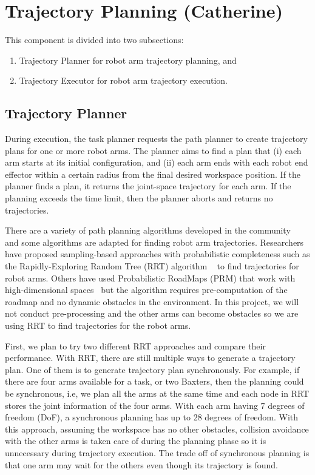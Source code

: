 \section{Trajectory Planning (Catherine)}

This component is divided into two subsections:
\begin{enumerate}%
\item Trajectory Planner for robot arm trajectory planning, and
\item Trajectory Executor for robot arm trajectory execution.
\end{enumerate}

\subsection{Trajectory Planner}

During execution, the task planner requests the path planner to create trajectory plans for one or more robot arms. The planner aims to find a plan that (i) each arm starts at its initial configuration, and (ii) each arm ends with each robot end effector within a certain radius from the final desired workspace position. If the planner finds a plan, it returns the joint-space trajectory for each arm. If the planning exceeds the time limit, then the planner aborts and returns no trajectories. 

There are a variety of path planning algorithms developed in the community~\cite{DBLP:books/daglib/0016830} and some algorithms are adapted for finding robot arm trajectories. 
Researchers have proposed sampling-based approaches with probabilistic completeness such as the Rapidly-Exploring Random Tree (RRT) algorithm ~\cite{VahrenkampBAKD09} to find trajectories for robot arms. Others have used Probabilistic RoadMaps (PRM) that work with high-dimensional spaces~\cite{KavrakiSLO96} but the algorithm requires pre-computation of the roadmap and no dynamic obstacles in the environment. In this project, we will not conduct pre-processing and the other arms can become obstacles so we are using RRT to find trajectories for the robot arms.

First, we plan to try two different RRT approaches and compare their performance. With RRT, there are still multiple ways to generate a trajectory plan.
One of them is to generate trajectory plan synchronously.
For example, if there are four arms available for a task, or two Baxters, then the planning could be synchronous, i.e, we plan all the arms at the same time and each node in RRT stores the joint information of the four arms. With each arm having 7 degrees of freedom (DoF), a synchronous planning has up to 28 degrees of freedom.
With this approach, assuming the workspace has no other obstacles, collision avoidance with the other arms is taken care of during the planning phase so it is unnecessary during trajectory execution.  
The trade off of synchronous planning is that one arm may wait for the others even though its trajectory is found.

